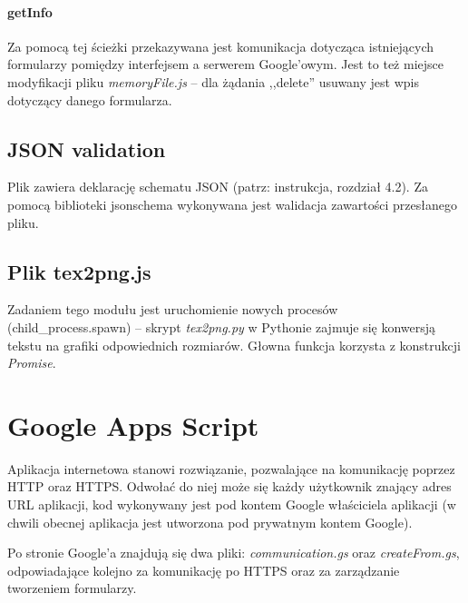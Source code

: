\paragraph{getInfo} Za pomocą tej ścieżki  przekazywana jest komunikacja dotycząca istniejących formularzy pomiędzy interfejsem a serwerem Google'owym. Jest to też miejsce modyfikacji pliku \textit{memoryFile.js} -- dla żądania ,,delete'' usuwany jest wpis dotyczący danego formularza.
\subsection{JSON validation} Plik zawiera deklarację schematu JSON (patrz: instrukcja, rozdział 4.2). Za pomocą biblioteki jsonschema wykonywana jest walidacja zawartości przesłanego pliku.
\subsection{Plik tex2png.js} Zadaniem tego modułu jest uruchomienie nowych procesów (child\_process.spawn)  -- skrypt \textit{tex2png.py} w Pythonie zajmuje się konwersją tekstu na grafiki odpowiednich rozmiarów. Głowna funkcja korzysta z konstrukcji \textit{Promise}.

\section{Google Apps Script}
Aplikacja internetowa stanowi rozwiązanie, pozwalające na komunikację poprzez HTTP oraz HTTPS. Odwołać do niej może się każdy użytkownik znający adres URL aplikacji, kod wykonywany jest pod kontem Google właściciela aplikacji (w chwili obecnej aplikacja jest utworzona pod prywatnym kontem Google).

\ind Po stronie Google'a znajdują się dwa pliki: \textit{communication.gs} oraz \textit{createFrom.gs}, odpowiadające kolejno za komunikację po HTTPS oraz za zarządzanie tworzeniem formularzy. 
